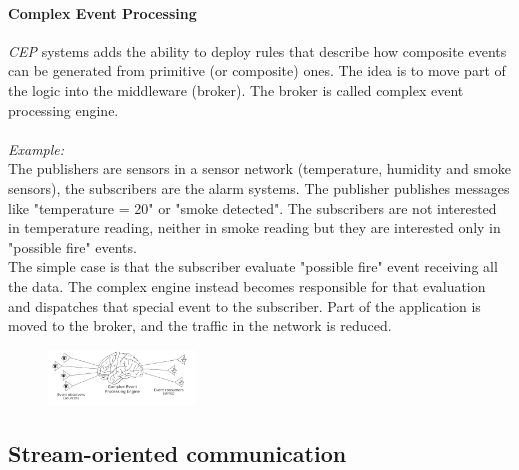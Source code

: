 \documentclass[10pt,a4paper]{article}
\begin{document}
\paragraph{Complex Event Processing}
\textit{CEP} systems adds the ability to deploy rules that describe how composite events can be generated from primitive (or composite) ones. The idea is to move part of the logic into the middleware (broker). The broker is called complex event processing engine. \\ \\
\textit{Example:} \\
The publishers are sensors in a sensor network (temperature, humidity and smoke sensors), the subscribers are the alarm systems. The publisher publishes messages like "temperature = 20" or "smoke detected". The subscribers are not interested in temperature reading, neither in smoke reading but they are interested only in "possible fire" events. \\
The simple case is that the subscriber evaluate "possible fire" event receiving all the data. The complex engine instead becomes responsible for that evaluation and dispatches that special event to the subscriber. Part of the application is moved to the broker, and the traffic in the network is reduced.
 \begin{figure}[h!]
 \hfill \includegraphics[width=110pt]{images/cep.png}\hspace*{\fill}
  \label{fig:cep}
\end{figure}
\subsection{Stream-oriented communication}
\end{document}
